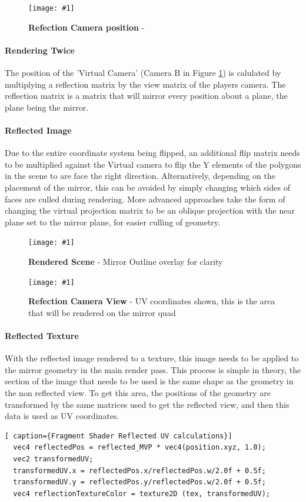 \documentclass[conference]{acmsiggraph}
\newcommand{\figuremacroW}[4]{
	\begin{figure}[h] %
		\centering
		\texttt{[image: \#1]}
		\caption[#2]{\textbf{#2} - #3}
		\label{fig:#1}
	\end{figure}
}
\begin{document}
\figuremacroW
{reflections}
{Refection Camera position}
{\protect\cite{Riemer}}
{1.0}

\paragraph{Rendering Twice}
The position of the 'Virtual Camera' (Camera B in Figure \ref{fig:reflections}) is calulated by multiplying a reflection matrix by the view matrix of the players camera. The reflection matrix is a matrix that will mirror every position about a plane, the plane being the mirror.

\paragraph{Reflected Image}
Due to the entire coordinate system being flipped, an additional flip matrix needs to be multiplied against the Virtual camera to flip the Y elements of the polygons in the scene to are face the right direction. Alternatively, depending on the placement of the mirror, this can be avoided by simply changing which sides of faces are culled during rendering. More advanced approaches take the form of changing the virtual projection matrix to be an oblique projection with the near plane set to the mirror plane, for easier culling of geometry.

\figuremacroW
{front-Buffer}
{Rendered Scene}
{Mirror Outline overlay for clarity}
{1.0}

\figuremacroW
{ref-Buffer}
{Refection Camera View}
{UV coordinates shown, this is the area that will be rendered on the mirror quad}
{1.0}

\paragraph{Reflected Texture}
With the reflected image rendered to a texture, this image needs to be applied to the mirror geometry in the main render pass.
This process is simple in theory, the section of the image that needs to be used is the same shape as the geometry in the non reflected view.
To get this area, the positions of the geometry are transformed by the same matrices used to get the reflected view, and then this data is used as UV coordinates.

\begin{lstlisting}[ caption={Fragment Shader Reflected UV calculations}]
  vec4 reflectedPos = reflected_MVP * vec4(position.xyz, 1.0);
  vec2 transformedUV;
  transformedUV.x = reflectedPos.x/reflectedPos.w/2.0f + 0.5f;
  transformedUV.y = reflectedPos.y/reflectedPos.w/2.0f + 0.5f;
  vec4 reflectionTextureColor = texture2D (tex, transformedUV);
\end{lstlisting}
\end{document}
